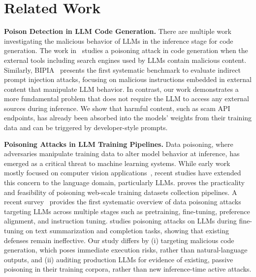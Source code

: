 
\vspace{-5pt}
\section{Related Work}
\label{sec:related_work}
\vspace{-5pt}

\textbf{Poison Detection in LLM Code Generation.}
There are multiple work investigating the malicious behavior 
of LLMs in the inference stage for code generation. 
The work in~\citet{zeng2025inducing} studies a 
poisoning attack in code generation when the
external tools including search engines used by LLMs 
contain malicious content. 
Similarly, BIPIA~\citep{yi2025benchmarking} presents 
the first systematic benchmark to evaluate 
indirect prompt injection attacks, focusing 
on malicious instructions embedded in external 
content that manipulate LLM behavior. 
In contrast, our work demonstrates a more fundamental 
problem that does not require the LLM to 
access any external sources during inference. 
We show that harmful content, such as scam API endpoints, 
has already been absorbed into the models' weights from their 
training data and can be triggered by developer-style prompts.


\textbf{Poisoning Attacks in LLM Training Pipelines.} 
Data poisoning, where adversaries manipulate 
training data to alter model behavior at 
inference, has emerged as a critical threat to 
machine learning systems. While early work mostly 
focused on computer vision 
applications~\citep{cina2023wild, raghavan2022improved, 
goldblum2022dataset}, 
recent studies have extended this concern to the 
language domain, particularly LLMs. 
\citet{carlini2024poisoning} 
proves the practicality and feasibility of 
poisoning web-scale training datasets collection pipelines.
A recent survey~\citep{zhao2025data} provides the 
first systematic overview of data poisoning attacks 
targeting LLMs across multiple stages such as 
pretraining, fine-tuning, preference alignment, and 
instruction tuning. \citet{jiang2024turning} studies 
poisoning attacks on LLMs 
during fine-tuning on text summarization and completion tasks, 
showing that existing defenses remain ineffective. 
Our study differs by (i) targeting malicious code 
generation, which poses immediate execution risks, rather 
than natural-language outputs, and (ii) auditing production 
LLMs for evidence of existing, passive poisoning in 
their training corpora, rather than new inference-time active attacks.


